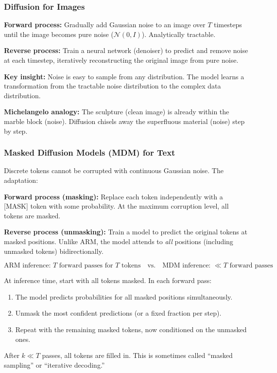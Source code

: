 \documentclass[11pt, a4paper]{article}
\begin{document}
\subsubsection{Diffusion for Images}

\begin{defbox}
\textbf{Forward process:} Gradually add Gaussian noise to an image over $T$ timesteps until the image becomes pure noise ($\mathcal{N}(0, I)$). Analytically tractable.

\textbf{Reverse process:} Train a neural network (denoiser) to predict and remove noise at each timestep, iteratively reconstructing the original image from pure noise.

\textbf{Key insight:} Noise is easy to sample from any distribution. The model learns a transformation from the tractable noise distribution to the complex data distribution.

\textbf{Michelangelo analogy:} The sculpture (clean image) is already within the marble block (noise). Diffusion chisels away the superfluous material (noise) step by step.
\end{defbox}

\subsubsection{Masked Diffusion Models (MDM) for Text}

\begin{defbox}
Discrete tokens cannot be corrupted with continuous Gaussian noise. The adaptation:

\textbf{Forward process (masking):} Replace each token independently with a [MASK] token with some probability. At the maximum corruption level, all tokens are masked.

\textbf{Reverse process (unmasking):} Train a model to predict the original tokens at masked positions. Unlike ARM, the model attends to \emph{all} positions (including unmasked tokens) bidirectionally.

\[
\text{ARM inference: } T \text{ forward passes for } T \text{ tokens} \quad \text{vs.} \quad \text{MDM inference: } \ll T \text{ forward passes}
\]
\end{defbox}

\begin{exbox}
At inference time, start with all tokens masked. In each forward pass:
\begin{enumerate}[leftmargin=1.5em]
  \item The model predicts probabilities for all masked positions simultaneously.
  \item Unmask the most confident predictions (or a fixed fraction per step).
  \item Repeat with the remaining masked tokens, now conditioned on the unmasked ones.
\end{enumerate}
After $k \ll T$ passes, all tokens are filled in. This is sometimes called ``masked sampling'' or ``iterative decoding.''
\end{exbox}
\end{document}
